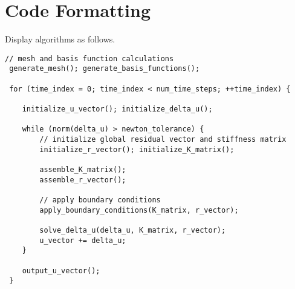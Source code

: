 %
%

\section{Code Formatting}

Display algorithms as follows.

\begin{lstlisting}[caption={\texttt{C++} pseudocode of an algorithm}]
 // mesh and basis function calculations
 generate_mesh(); generate_basis_functions();

 for (time_index = 0; time_index < num_time_steps; ++time_index) {

	initialize_u_vector(); initialize_delta_u();

	while (norm(delta_u) > newton_tolerance) {
		// initialize global residual vector and stiffness matrix
		initialize_r_vector(); initialize_K_matrix();

		assemble_K_matrix();
		assemble_r_vector();

		// apply boundary conditions
		apply_boundary_conditions(K_matrix, r_vector);

		solve_delta_u(delta_u, K_matrix, r_vector);
		u_vector += delta_u;
	}

	output_u_vector();
 }
\end{lstlisting}

